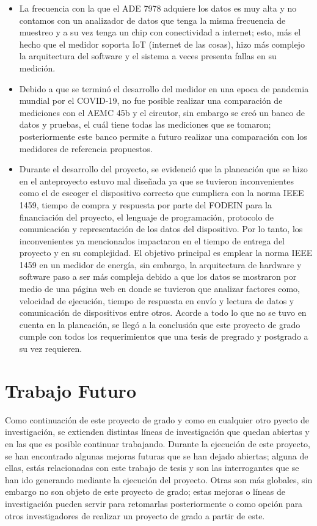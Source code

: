 \begin{itemize}
    \item La frecuencia con la que el ADE 7978 adquiere los datos es muy alta y no contamos con un analizador de datos que tenga la misma frecuencia de muestreo y a su vez tenga un chip con conectividad a internet; esto, más el hecho que el medidor soporta IoT (internet de las cosas), hizo más complejo la arquitectura del software y el sistema a veces presenta fallas en su medición.
    \item Debido a que se terminó el desarrollo del medidor en una epoca de pandemia mundial por el COVID-19, no fue posible realizar una comparación de mediciones con el AEMC 45b y el circutor, sin embargo se creó un banco de datos y pruebas, el cuál tiene todas las mediciones que se tomaron; posteriormente este banco permite a futuro realizar una comparación con los medidores de referencia propuestos.
    \item Durante el desarrollo del proyecto, se evidenció que la planeación que se hizo en el anteproyecto estuvo mal diseñada ya que se tuvieron inconvenientes como el de escoger el dispositivo correcto que cumpliera con la norma IEEE 1459, tiempo de compra y respuesta por parte del FODEIN para la financiación del proyecto, el lenguaje de programación, protocolo de comunicación y representación de los datos del dispositivo. Por lo tanto, los inconvenientes ya mencionados impactaron en el tiempo de entrega del proyecto y en su complejidad. El objetivo principal es emplear la norma IEEE 1459 en un medidor de energía, sin embargo, la arquitectura de hardware y software paso a ser más compleja debido a que los datos se mostraron por medio de una página web en donde se tuvieron que analizar factores como, velocidad de ejecución, tiempo de respuesta en envío y lectura de datos y comunicación de dispositivos entre otros. Acorde a todo lo que no se tuvo en cuenta en la planeación, se llegó a la conclusión que este proyecto de grado cumple con todos los requerimientos que una tesis de pregrado y postgrado a su vez requieren.



\end{itemize}
\chapter{ Trabajo Futuro}
Como continuación de este proyecto de grado y como en cualquier otro pyecto de investigación, se extienden distintas líneas de investigación que quedan abiertas y en las que es posible continuar trabajando. Durante la ejecución de este proyecto, se han encontrado algunas mejoras futuras que se han dejado abiertas; alguna de ellas, estás relacionadas con este trabajo de tesis y son las interrogantes que se han ido generando mediante la ejecución del proyecto. Otras son más globales, sin embargo no son objeto de este proyecto de grado; estas mejoras o líneas de investigación pueden servir para retomarlas posteriormente o como opción para otros investigadores de realizar un proyecto de grado a partir de este. \\

